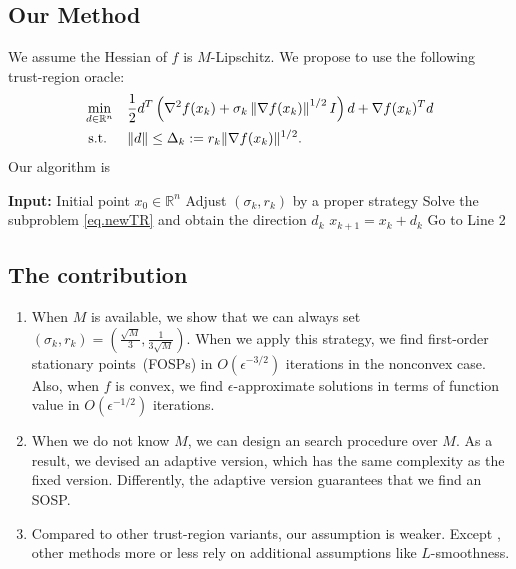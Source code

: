 \documentclass{mcom-l}
\numberwithin{equation}{section}
\begin{document}
\subsection{Our Method}
We assume the Hessian of $f$ is $M$-Lipschitz. We propose to use the following trust-region oracle:
\begin{equation}
    \begin{aligned}
        \min_{d \in \mathbb{R}^n} \quad & \frac{1}{2}d^T\left (\nabla^2 f(x_k) + \sigma_k \left \|\nabla f(x_k)\right\|^{1/2} I \right ) d + \nabla f(x_k)^T d \\
        \text{s.t. } \quad              & \|d\| \le \Delta_k := r_k \|\nabla f(x_k)\|^{1/2}.
        \label{eq.newTR}
    \end{aligned}
\end{equation}
Our algorithm is
\begin{algorithm}[!h]
    \caption{A \textbf{U}niversal \textbf{T}rust-\textbf{R}egion Method (UTR)}\label{alg.conceptual utr}
    \begin{algorithmic}[1]
        \STATE \textbf{Input:} Initial point $x_0 \in \mathbb{R}^n$
        \STATE Adjust $(\sigma_k, r_k)$ by a proper strategy
        \STATE Solve the subproblem \eqref{eq.newTR} and obtain the direction $d_k$
        \STATE $x_{k+1} = x_k + d_k$
        \ELSE
        \STATE Go to Line 2
        \ENDIF
        \ENDFOR
    \end{algorithmic}
\end{algorithm}
\subsection{The contribution}
\begin{enumerate}
    \item When $M$ is available, we show that we can always set $(\sigma_k,r_k) = (\frac{\sqrt{M}}{3},\frac{1}{3\sqrt{M}})$. When we apply this strategy, we find first-order stationary points~(FOSPs) in $O(\epsilon^{-3/2})$ iterations in the nonconvex case. Also, when $f$ is convex, we find $\epsilon$-approximate solutions in terms of function value in $O(\epsilon^{-1/2})$ iterations.
    \item When we do not know $M$, we can design an search procedure over $M$. As a result, we devised an adaptive version, which has the same complexity as the fixed version. Differently, the adaptive version guarantees that we find an SOSP.
    \item Compared to other trust-region variants, our assumption is weaker. Except \citet{curtis2021trust}, other methods more or less rely on additional assumptions like $L$-smoothness.
\end{enumerate}
\end{document}
